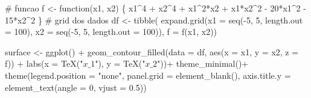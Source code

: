 \documentclass[
  a4paperpaper,
]{article}
\newenvironment{Shaded}{\begin{snugshade}}{\end{snugshade}}
\newcommand{\AttributeTok}[1]{\textcolor[rgb]{0.40,0.45,0.13}{#1}}
\newcommand{\CommentTok}[1]{\textcolor[rgb]{0.37,0.37,0.37}{#1}}
\newcommand{\ControlFlowTok}[1]{\textcolor[rgb]{0.00,0.23,0.31}{#1}}
\newcommand{\DecValTok}[1]{\textcolor[rgb]{0.68,0.00,0.00}{#1}}
\newcommand{\FloatTok}[1]{\textcolor[rgb]{0.68,0.00,0.00}{#1}}
\newcommand{\FunctionTok}[1]{\textcolor[rgb]{0.28,0.35,0.67}{#1}}
\newcommand{\NormalTok}[1]{\textcolor[rgb]{0.00,0.23,0.31}{#1}}
\newcommand{\OtherTok}[1]{\textcolor[rgb]{0.00,0.23,0.31}{#1}}
\newcommand{\SpecialCharTok}[1]{\textcolor[rgb]{0.37,0.37,0.37}{#1}}
\newcommand{\StringTok}[1]{\textcolor[rgb]{0.13,0.47,0.30}{#1}}
\begin{document}
\begin{Shaded}
\begin{Highlighting}[]
\CommentTok{\# funcao}
\NormalTok{f }\OtherTok{\textless{}{-}} \ControlFlowTok{function}\NormalTok{(x1, x2) \{}
\NormalTok{  x1}\SpecialCharTok{\^{}}\DecValTok{4} \SpecialCharTok{+}\NormalTok{ x2}\SpecialCharTok{\^{}}\DecValTok{4} \SpecialCharTok{+}\NormalTok{ x1}\SpecialCharTok{\^{}}\DecValTok{2}\SpecialCharTok{*}\NormalTok{x2 }\SpecialCharTok{+}\NormalTok{ x1}\SpecialCharTok{*}\NormalTok{x2}\SpecialCharTok{\^{}}\DecValTok{2} \SpecialCharTok{{-}} \DecValTok{20}\SpecialCharTok{*}\NormalTok{x1}\SpecialCharTok{\^{}}\DecValTok{2} \SpecialCharTok{{-}} \DecValTok{15}\SpecialCharTok{*}\NormalTok{x2}\SpecialCharTok{\^{}}\DecValTok{2}
\NormalTok{\}}
\CommentTok{\# grid dos dados}
\NormalTok{df }\OtherTok{\textless{}{-}} \FunctionTok{tibble}\NormalTok{(}
  \FunctionTok{expand.grid}\NormalTok{(}\AttributeTok{x1 =} \FunctionTok{seq}\NormalTok{(}\SpecialCharTok{{-}}\DecValTok{5}\NormalTok{, }\DecValTok{5}\NormalTok{, }\AttributeTok{length.out =} \DecValTok{100}\NormalTok{),}
              \AttributeTok{x2 =} \FunctionTok{seq}\NormalTok{(}\SpecialCharTok{{-}}\DecValTok{5}\NormalTok{, }\DecValTok{5}\NormalTok{, }\AttributeTok{length.out =} \DecValTok{100}\NormalTok{)),}
  \AttributeTok{f =} \FunctionTok{f}\NormalTok{(x1, x2))}

\NormalTok{surface }\OtherTok{\textless{}{-}} \FunctionTok{ggplot}\NormalTok{() }\SpecialCharTok{+}
  \FunctionTok{geom\_contour\_filled}\NormalTok{(}\AttributeTok{data =}\NormalTok{ df, }\FunctionTok{aes}\NormalTok{(}\AttributeTok{x =}\NormalTok{ x1, }\AttributeTok{y =}\NormalTok{ x2, }\AttributeTok{z =}\NormalTok{ f)) }\SpecialCharTok{+}
  \FunctionTok{labs}\NormalTok{(}\AttributeTok{x =} \FunctionTok{TeX}\NormalTok{(}\StringTok{"$x\_1$"}\NormalTok{), }\AttributeTok{y =} \FunctionTok{TeX}\NormalTok{(}\StringTok{"$x\_2$"}\NormalTok{))}\SpecialCharTok{+}
  \FunctionTok{theme\_minimal}\NormalTok{()}\SpecialCharTok{+}
  \FunctionTok{theme}\NormalTok{(}\AttributeTok{legend.position =} \StringTok{"none"}\NormalTok{,}
        \AttributeTok{panel.grid =} \FunctionTok{element\_blank}\NormalTok{(),}
        \AttributeTok{axis.title.y =} \FunctionTok{element\_text}\NormalTok{(}\AttributeTok{angle =} \DecValTok{0}\NormalTok{, }\AttributeTok{vjust =} \FloatTok{0.5}\NormalTok{))}
\end{Highlighting}
\end{Shaded}
\end{document}
